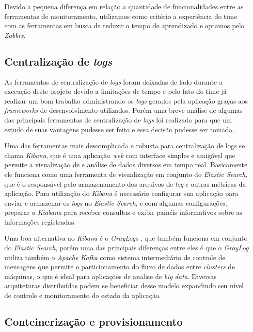 \documentclass[
12pt,				%
openright,			%
oneside,			%
a4paper,			%
english,			%
french,				%
spanish,			%
brazil,				%
]{abntex2}
\begin{document}
Devido a pequena diferença em relação a quantidade de funcionalidades entre as ferramentas de monitoramento, utilizamos como critério a experiência do time com as ferramentas em busca de reduzir o tempo de aprendizado e optamos pelo \textit{Zabbix}.

\subsection{Centralização de \textit{logs}}

As ferramentas de centralização de \textit{logs} foram deixadas de lado durante a execução deste projeto devido a limitações de tempo e pelo fato do time já realizar um bom trabalho administrando os \textit{logs} gerados pela aplicação graças aos \textit{frameworks} de desenvolvimento utilizados. Porém uma breve análise de algumas das principais ferramentas de centralização de \textit{logs} foi realizada para que um estudo de suas vantagens pudesse ser feito e essa decisão pudesse ser tomada.

Uma das ferramentas mais descomplicada e robusta para centralização de logs se chama \textit{Kibana}, que é uma aplicação \textit{web} com interface simples e amigável que permite a visualização de e análise de dados diversos em tempo real. Basicamente ele funciona como uma ferramenta de visualização em conjunto do \textit{Elastic Search}, que é o responsável pelo armazenamento dos arquivos de \textit{log} e outras métricas da aplicação. Para utilização do \textit{Kibana} é necessário configurar sua aplicação para enviar e armazenar os \textit{logs} no \textit{Elastic Search}, e com algumas configurações, preparar o \textit{Kiabana} para receber consultas e exibir painéis informativos sobre as informações registradas\cite{Kibana:Logs}.

Uma boa alternativa ao \textit{Kibana} é o \textit{GrayLogs} \cite{GrayLog:Logs}, que também funciona em conjunto do \textit{Elastic Search}, porém uma das principais diferenças entre eles é que o \textit{GrayLog} utiliza também o \textit{Apache Kafka} como sistema intermediário de controle de mensagens que permite o particionamento do fluxo de dados entre \textit{clusters} de máquinas, o que é ideal para aplicações de analise de \textit{big data}. Diversas arquiteturas distribuídas podem se beneficiar desse modelo expandindo seu nível de controle e monitoramento do estado da aplicação.

\subsection{Conteinerização e provisionamento}
\end{document}
